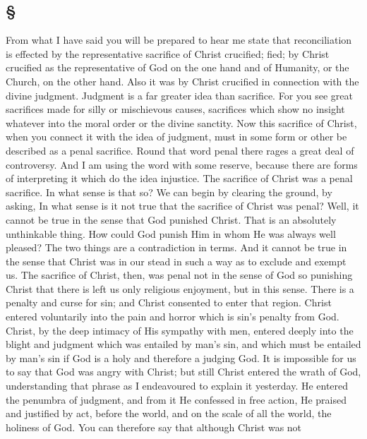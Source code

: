 \documentclass[draft]{ptfdoc}
\begin{document}
\subsection*{
\S
}

From what I have said you will be prepared 
to hear me state that reconciliation is effected 
by the representative sacrifice of Christ crucified;
fied; by Christ crucified as the representative of 
God on the one hand and of Humanity, or the 
Church, on the other hand. Also it was by 
Christ crucified in connection with the divine 
judgment. Judgment is a far greater idea than 
sacrifice. For you see great sacrifices made for 
silly or mischievous causes, sacrifices which show 
no insight whatever into the moral order or the 
divine sanctity. Now this sacrifice of Christ, 
when you connect it with the idea of judgment, 
must in some form or other be described as a 
penal sacrifice. Round that word penal there 
rages a great deal of controversy. And I am 
using the word with some reserve, because there 
are forms of interpreting it which do the idea 
injustice. The sacrifice of Christ was a penal 
sacrifice. In what sense is that so? We can 
begin by clearing the ground, by asking, In 
what sense is it not true that the sacrifice of 
Christ was penal? Well, it cannot be true in 
the sense that God punished Christ. That is an 
absolutely unthinkable thing. How could God 
punish Him in whom He was always well 
pleased? The two things are a contradiction 
in terms. And it cannot be true in the sense 
that Christ was in our stead in such a way as 
to exclude and exempt us. The sacrifice of 
Christ, then, was penal not in the sense of God 
so punishing Christ that there is left us only 
religious enjoyment, but in this sense. There is 
a penalty and curse for sin; and Christ consented 
to enter that region. Christ entered voluntarily 
into the pain and horror which is sin's penalty 
from God. Christ, by the deep intimacy of His 
sympathy with men, entered deeply into the 
blight and judgment which was entailed by 
man's sin, and which must be entailed by man's 
sin if God is a holy and therefore a judging 
God. It is impossible for us to say that God 
was angry with Christ; but still Christ entered 
the wrath of God, understanding that phrase 
as I endeavoured to explain it yesterday. He 
entered the penumbra of judgment, and from 
it He confessed in free action, He praised and 
justified by act, before the world, and on the 
scale of all the world, the holiness of God. You 
can therefore say that although Christ was not 
\end{document}
